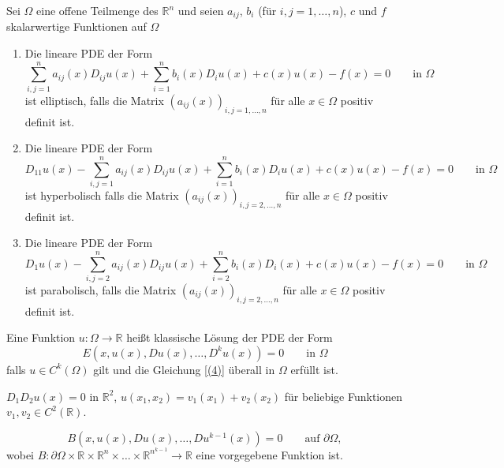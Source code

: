 \begin{beispiel}
Sei $\Omega$ eine offene Teilmenge des $\mathbb{R}^n$ und seien $a_{ij}$, $b_i$ (für $i,j=1,\dots,n$), $c$ und $f$ skalarwertige Funktionen auf $\Omega$
\begin{enumerate}
	\item Die lineare PDE der Form
	\[
		\sum^{n}_{i,j=1} a_{ij}(x) D_{ij}u(x) + \sum^{n}_{i=1}b_i(x) D_iu(x) + c(x)u(x) - f(x) = 0 \qquad \text{in } \Omega
	\]
	ist elliptisch, falls die Matrix $\left(a_{ij}(x)\right)_{i,j=1,\dots,n}$ für alle $x \in \Omega$ positiv definit ist.
	\item Die lineare PDE der Form 
	\[
		D_11u(x) - \sum^{n}_{i,j=1} a_{ij}(x)D_{ij}u(x) + \sum^{n}_{i=1}b_i(x) D_iu(x) + c(x)u(x) - f(x) = 0 \qquad \text{in }\Omega
	\]
	ist hyperbolisch falls die Matrix $\left( a_{ij}(x) \right)_{i,j=2,\dots,n}$ für alle $x \in \Omega$ positiv definit ist.
	\item Die lineare PDE der Form 
	\begin{equation}
		D_1u(x) - \sum^{n}_{i,j=2}a_{ij}(x)D_{ij}u(x) + \sum^{n}_{i=2}b_i(x)D_i(x) + c(x)u(x)- f(x)= 0 \qquad \text{in } \Omega
	\end{equation}
	ist parabolisch, falls die Matrix $\left( a_{ij}(x) \right)_{i,j=2,\dots,n}$ für alle $x \in \Omega$ positiv definit ist.
 \end{enumerate}
\end{beispiel}

\begin{definition}
	Eine Funktion $u: \Omega \to  \mathbb{R}$ heißt klassische Lösung der PDE der Form 
	\begin{equation}
		E(x,u(x),Du(x),\dots,D^ku(x))=0 \qquad  \text{in } \Omega \label{(4)}
	\end{equation}
	falls $u \in  C^k(\Omega)$ gilt und die Gleichung \eqref{(4)} überall in $\Omega$ erfüllt ist.
\end{definition}

\begin{beispiel}
	$D_1D_2u(x)=0$ in $\mathbb{R}^2$, $u(x_1,x_2)=v_1(x_1)+v_2(x_2)$ für beliebige Funktionen $v_1,v_2 \in C^2(\mathbb{R})$.
\end{beispiel}  

\begin{nb} 
\[
	B(x,u(x),Du(x),\dots,Du^{k-1}(x))=0 \qquad  \text{auf }\partial \Omega,
\] wobei $B: \partial \Omega \times \mathbb{R} \times \mathbb{R}^n \times \dots \times \mathbb{R}^{n^{k-1}} \to \mathbb{R}$ eine vorgegebene Funktion ist.
\end{nb}

